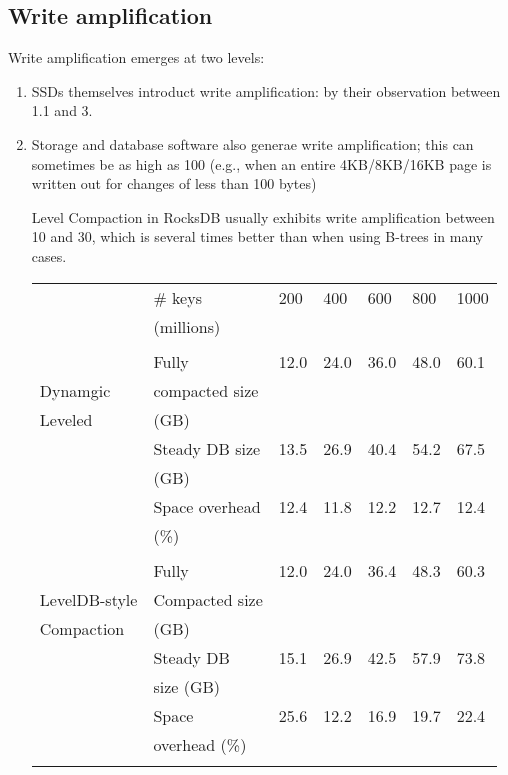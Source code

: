 \documentclass[11pt]{article}
\begin{document}
\subsection{Write amplification}
\label{sec:org47e09eb}
Write amplification emerges at two levels:
\begin{enumerate}
\item SSDs themselves introduct write amplification: by their observation between 1.1 and 3.
\item Storage and database software also generae write amplification; this can sometimes be as high as
100 (e.g., when an entire 4KB/8KB/16KB page is written out for changes of less than 100 bytes)

Level Compaction in RocksDB usually exhibits write amplification between 10 and 30, which is
several times better than when using B-trees in many cases.

\begin{center}
\begin{tabular}{|l|l|l|l|l|l|l|}
\hline
 & \# keys & 200 & 400 & 600 & 800 & 1000 \\
 & (millions) & & & & & \\
 & & & & & & \\
\hline
 & Fully & 12.0 & 24.0 & 36.0 & 48.0 & 60.1 \\
Dynamgic & compacted size & & & & & \\
Leveled & (GB) & & & & & \\
\cline{2-7}
 & Steady DB size & 13.5 & 26.9 & 40.4 & 54.2 & 67.5 \\
 & (GB) & & & & & \\
\cline{2-7}
 & Space overhead & 12.4 & 11.8 & 12.2 & 12.7 & 12.4 \\
 & (\%) & & & & & \\
 & & & & & & \\
\hline
 & Fully & 12.0 & 24.0 & 36.4 & 48.3 & 60.3 \\
LevelDB-style & Compacted size & & & & & \\
Compaction & (GB) & & & & & \\
\cline{2-7}
 & Steady DB & 15.1 & 26.9 & 42.5 & 57.9 & 73.8 \\
 & size (GB) & & & & & \\
\cline{2-7}
 & Space & 25.6 & 12.2 & 16.9 & 19.7 & 22.4 \\
 & overhead (\%) & & & & & \\
 & & & & & & \\
\hline
\end{tabular}
\end{center}
\end{enumerate}
\end{document}

